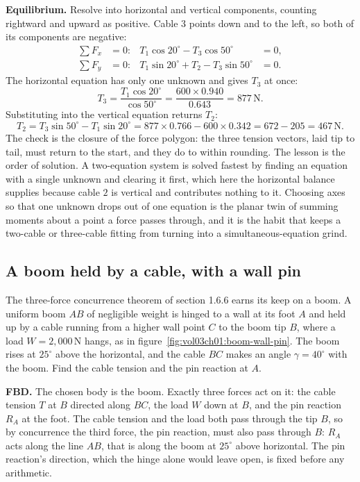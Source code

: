 \textbf{Equilibrium.} Resolve into horizontal and vertical components,
counting rightward and upward as positive. Cable $3$ points down and to
the left, so both of its components are negative:
\begin{align*}
\sum F_x &= 0: & T_1\cos 20^{\circ} - T_3\cos 50^{\circ} &= 0, \\
\sum F_y &= 0: & T_1\sin 20^{\circ} + T_2 - T_3\sin 50^{\circ} &= 0.
\end{align*}
The horizontal equation has only one unknown and gives $T_3$ at once:
\[
T_3 = \frac{T_1\cos 20^{\circ}}{\cos 50^{\circ}}
= \frac{600 \times 0.940}{0.643} = 877\,\text{N}.
\]
Substituting into the vertical equation returns $T_2$:
\[
T_2 = T_3\sin 50^{\circ} - T_1\sin 20^{\circ}
= 877 \times 0.766 - 600 \times 0.342 = 672 - 205 = 467\,\text{N}.
\]
The check is the closure of the force polygon: the three tension vectors,
laid tip to tail, must return to the start, and they do to within rounding.
The lesson is the order of solution. A two-equation system is solved
fastest by finding an equation with a single unknown and clearing it first,
which here the horizontal balance supplies because cable $2$ is vertical
and contributes nothing to it. Choosing axes so that one unknown drops out
of one equation is the planar twin of summing moments about a point a force
passes through, and it is the habit that keeps a two-cable or three-cable
fitting from turning into a simultaneous-equation grind.

\subsection{A boom held by a cable, with a wall pin}



The three-force concurrence theorem of section 1.6.6 earns its keep on a
boom. A uniform boom $AB$ of negligible weight is hinged to a wall at its
foot $A$ and held up by a cable running from a higher wall point $C$ to the
boom tip $B$, where a load $W = 2{,}000\,\text{N}$ hangs, as in
figure~\ref{fig:vol03ch01:boom-wall-pin}. The boom rises at $25^{\circ}$
above the horizontal, and the cable $BC$ makes an angle $\gamma =
40^{\circ}$ with the boom. Find the cable tension and the pin reaction at
$A$.

\textbf{FBD.} The chosen body is the boom. Exactly three forces act on it:
the cable tension $T$ at $B$ directed along $BC$, the load $W$ down at $B$,
and the pin reaction $R_A$ at the foot. The cable tension and the load both
pass through the tip $B$, so by concurrence the third force, the pin
reaction, must also pass through $B$: $R_A$ acts along the line $AB$, that
is along the boom at $25^{\circ}$ above horizontal. The pin reaction's
direction, which the hinge alone would leave open, is fixed before any
arithmetic.

